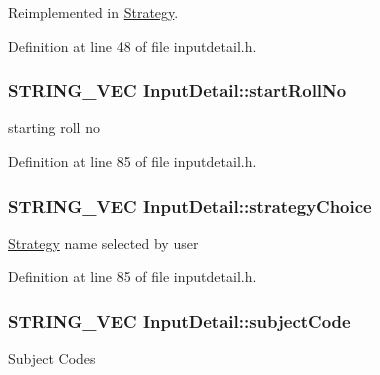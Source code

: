 \-Reimplemented in \hyperlink{classStrategy_a190510a0a4957ac947ce5a09d2f7dad8}{\-Strategy}.



\-Definition at line 48 of file inputdetail.\-h.

\hypertarget{classInputDetail_a7262436753ac62bf068cc23b97049f61}{
\subsubsection[{start\-Roll\-No}]{\setlength{\rightskip}{0pt plus 5cm}\-S\-T\-R\-I\-N\-G\-\_\-\-V\-E\-C {\bf \-Input\-Detail\-::start\-Roll\-No}}}\label{classInputDetail_a7262436753ac62bf068cc23b97049f61}
starting roll no 

\-Definition at line 85 of file inputdetail.\-h.

\hypertarget{classInputDetail_acbdbb6ecb850dec574b5878764c56c88}{
\subsubsection[{strategy\-Choice}]{\setlength{\rightskip}{0pt plus 5cm}\-S\-T\-R\-I\-N\-G\-\_\-\-V\-E\-C {\bf \-Input\-Detail\-::strategy\-Choice}}}\label{classInputDetail_acbdbb6ecb850dec574b5878764c56c88}
\hyperlink{classStrategy}{\-Strategy} name selected by user 

\-Definition at line 85 of file inputdetail.\-h.

\hypertarget{classInputDetail_ab391f03f242defb952e24a584eefdb35}{
\subsubsection[{subject\-Code}]{\setlength{\rightskip}{0pt plus 5cm}\-S\-T\-R\-I\-N\-G\-\_\-\-V\-E\-C {\bf \-Input\-Detail\-::subject\-Code}}}\label{classInputDetail_ab391f03f242defb952e24a584eefdb35}
\-Subject \-Codes 

